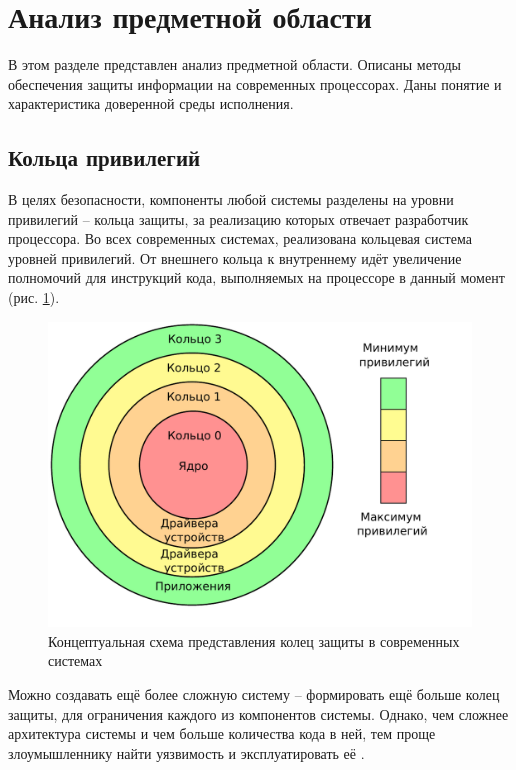 \section{Анализ предметной области}

В этом разделе представлен анализ предметной области. Описаны методы обеспечения защиты информации на современных процессорах. Даны понятие и характеристика доверенной среды исполнения.

\subsection{Кольца привилегий}

В целях безопасности, компоненты любой системы разделены на уровни привилегий -- кольца защиты, за реализацию которых отвечает разработчик процессора. Во всех современных системах, реализована кольцевая система уровней привилегий. От внешнего кольца к внутреннему идёт увеличение полномочий для инструкций кода, выполняемых на процессоре в данный момент (рис. \ref{fig:rings}).

\begin{figure}[h]
	\centering
	\includegraphics[width=\textwidth]{img/rings.pdf}
	\caption{Концептуальная схема представления колец защиты в современных системах}
	\label{fig:rings}
\end{figure}

Можно создавать ещё более сложную систему -- формировать ещё больше колец защиты, для ограничения каждого из компонентов системы. Однако, чем сложнее архитектура системы и чем больше количества кода в ней, тем проще злоумышленнику найти уязвимость и эксплуатировать её \cite{complex-systems}.

